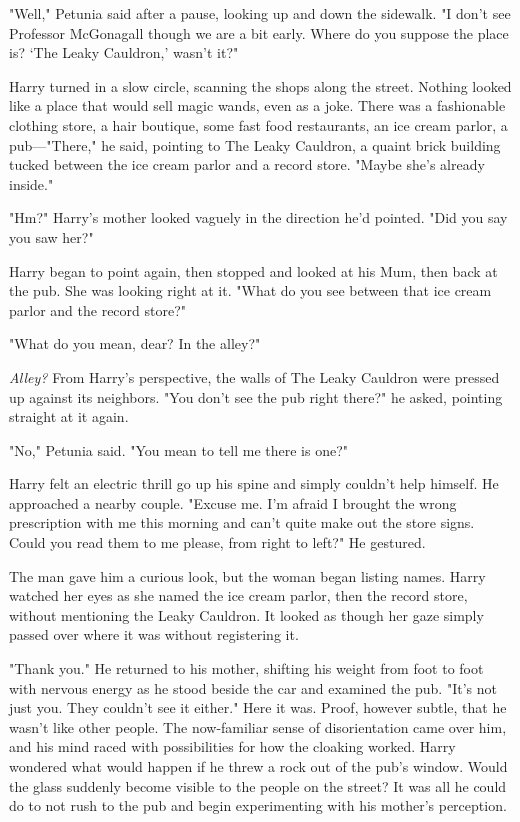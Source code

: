 "Well," Petunia said after a pause, looking up and down
the sidewalk. "I don't see Professor McGonagall{\el} though
we are a bit early. Where do you suppose the place is?
`The Leaky Cauldron,' wasn't it?"

Harry turned in a slow circle, scanning the shops along the
street. Nothing looked like a place that would sell magic
wands, even as a joke. There was a fashionable clothing
store, a hair boutique, some fast food
restaurants, an ice cream parlor, a pub—"There," he said,
pointing to The Leaky Cauldron, a quaint brick building
tucked between the ice cream parlor and a record store. "Maybe
she's already inside."

"Hm?" Harry's mother looked vaguely in the direction he'd
pointed. "Did you say you saw her?"

Harry began to point again, then stopped and looked at
his Mum, then back at the pub. She was looking right at
it. "What do you see between that ice cream parlor and the
record store?"

"What do you mean, dear? In the alley?"

\emph{Alley?} From Harry's perspective, the walls of The Leaky
Cauldron were pressed up against its neighbors. "You don't
see the pub right there?" he asked, pointing straight at it
again.

"No," Petunia said. "You mean to tell me there is one?"

Harry felt an electric thrill go up his spine and simply
couldn't help himself. He approached a nearby couple.
"Excuse me. I'm afraid I brought
the wrong prescription with me this morning and can't
quite make out the store signs. Could you read them to
me please, from right to left?" He gestured.

The man gave him a curious look, but the woman began
listing names. Harry watched her eyes as she named the
ice cream parlor, then the record store, without mentioning the
Leaky Cauldron. It looked as though her gaze simply
passed over where it was without registering it.

"Thank you." He returned to his mother, shifting his weight
from foot to foot with nervous energy as he stood beside
the car and examined the pub. "It's not just you. They
couldn't see it either." Here it was. Proof, however subtle,
that he wasn't like other people. The now-familiar sense of
disorientation came over him, and his mind raced with
possibilities for how the cloaking worked. Harry wondered
what would happen if he threw a rock out of the pub's
window. Would the glass suddenly become visible to the
people on the street? It was all he could do to not rush
to the pub and begin experimenting with his mother's
perception.

